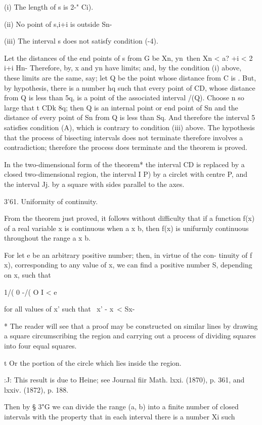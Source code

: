 (i) The length of s is 2-" Ci).

(ii) No point of s,i+i is outside Sn-

(iii) The interval s does not satisfy condition (-4).

Let the distances of the end points of s from G be Xn, yn\ then Xn <
a? +i < 2 i+i Hn- Therefore, by, x and yn have limits; and, by
the condition (i) above, these limits are the same, say; let Q be the
point whose distance from C is . But, by hypothesis, there is a number
hq such that every point of CD, whose distance from Q is less than 5q,
is a point of the associated interval /(Q). Choose n so large that t
CDk 8q; then Q is an internal point or end point of Sn and the
distance of every point of Sn from Q is less than Sq. And therefore
the interval 5 satisfies condition (A), which is contrary to condition
(iii) above. The hypothesis that the process of bisecting intervals
does not terminate therefore involves a contradiction; therefore the
process does terminate and the theorem is proved.

In the two-dimensional form of the theorem* the interval CD is
replaced by a closed two-dimensional region, the interval I P) by a
circlet with centre P, and the interval Jj. by a square with sides
parallel to the axes.

3'61. Uniformity of continuity.

From the theorem just proved, it follows without difficulty that if a
function f(x) of a real variable x is continuous when a x b, then f(x)
is unifurmly continuous throughout the range a x b.

For let e be an arbitrary positive number; then, in virtue of the
con- tinuity of f x), corresponding to any value of x, we can find a
positive number S, depending on x, such that

1/( 0 -/( O I < e

for all values of x' such that \ x' - x\ < Sx-

* The reader will see that a proof may be constructed on similar lines
by drawing a square circumscribing the region and carrying out a
process of dividing squares into four equal squares.

t Or the portion of the circle which lies inside the region.

:J: This result is due to Heine; see Journal fiir Math. lxxi. (1870),
p. 361, and lxxiv. (1872), p. 188.

%
%

Then by § 3"G we can divide the range (a, b) into a finite number of
closed intervals with the property that in each interval there is a
number Xi such

